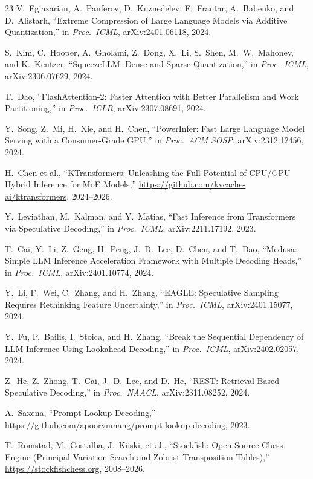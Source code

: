 \documentclass[10pt,twocolumn]{article}
\begin{document}
{\begin{thebibliography}{23}
V.~Egiazarian, A.~Panferov, D.~Kuznedelev, E.~Frantar, A.~Babenko, and D.~Alistarh, ``Extreme Compression of Large Language Models via Additive Quantization,'' in \emph{Proc.\ ICML}, arXiv:2401.06118, 2024.

S.~Kim, C.~Hooper, A.~Gholami, Z.~Dong, X.~Li, S.~Shen, M.~W.~Mahoney, and K.~Keutzer, ``SqueezeLLM: Dense-and-Sparse Quantization,'' in \emph{Proc.\ ICML}, arXiv:2306.07629, 2024.

T.~Dao, ``FlashAttention-2: Faster Attention with Better Parallelism and Work Partitioning,'' in \emph{Proc.\ ICLR}, arXiv:2307.08691, 2024.

Y.~Song, Z.~Mi, H.~Xie, and H.~Chen, ``PowerInfer: Fast Large Language Model Serving with a Consumer-Grade GPU,'' in \emph{Proc.\ ACM SOSP}, arXiv:2312.12456, 2024.

H.~Chen et al., ``KTransformers: Unleashing the Full Potential of CPU/GPU Hybrid Inference for MoE Models,'' \url{https://github.com/kvcache-ai/ktransformers}, 2024--2026.

Y.~Leviathan, M.~Kalman, and Y.~Matias, ``Fast Inference from Transformers via Speculative Decoding,'' in \emph{Proc.\ ICML}, arXiv:2211.17192, 2023.

T.~Cai, Y.~Li, Z.~Geng, H.~Peng, J.~D.~Lee, D.~Chen, and T.~Dao, ``Medusa: Simple LLM Inference Acceleration Framework with Multiple Decoding Heads,'' in \emph{Proc.\ ICML}, arXiv:2401.10774, 2024.

Y.~Li, F.~Wei, C.~Zhang, and H.~Zhang, ``EAGLE: Speculative Sampling Requires Rethinking Feature Uncertainty,'' in \emph{Proc.\ ICML}, arXiv:2401.15077, 2024.

Y.~Fu, P.~Bailis, I.~Stoica, and H.~Zhang, ``Break the Sequential Dependency of LLM Inference Using Lookahead Decoding,'' in \emph{Proc.\ ICML}, arXiv:2402.02057, 2024.

Z.~He, Z.~Zhong, T.~Cai, J.~D.~Lee, and D.~He, ``REST: Retrieval-Based Speculative Decoding,'' in \emph{Proc.\ NAACL}, arXiv:2311.08252, 2024.

A.~Saxena, ``Prompt Lookup Decoding,'' \url{https://github.com/apoorvumang/prompt-lookup-decoding}, 2023.

T.~Romstad, M.~Costalba, J.~Kiiski, et al., ``Stockfish: Open-Source Chess Engine (Principal Variation Search and Zobrist Transposition Tables),'' \mbox{\url{https://stockfishchess.org}}, 2008--2026.

\end{thebibliography}
}
\end{document}
